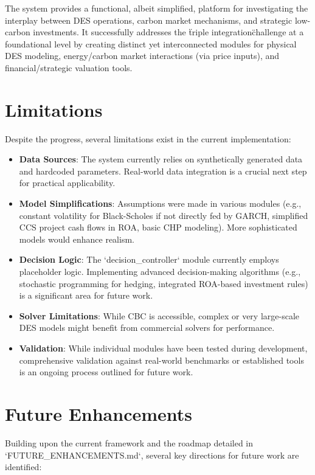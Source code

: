 The system provides a functional, albeit simplified, platform for investigating the interplay between DES operations, carbon market mechanisms, and strategic low-carbon investments. It successfully addresses the \"triple integration\" challenge at a foundational level by creating distinct yet interconnected modules for physical DES modeling, energy/carbon market interactions (via price inputs), and financial/strategic valuation tools.

\section{Limitations}
Despite the progress, several limitations exist in the current implementation:
\begin{itemize}
    \item \textbf{Data Sources}: The system currently relies on synthetically generated data and hardcoded parameters. Real-world data integration is a crucial next step for practical applicability.
    \item \textbf{Model Simplifications}: Assumptions were made in various modules (e.g., constant volatility for Black-Scholes if not directly fed by GARCH, simplified CCS project cash flows in ROA, basic CHP modeling). More sophisticated models would enhance realism.
    \item \textbf{Decision Logic}: The `decision_controller` module currently employs placeholder logic. Implementing advanced decision-making algorithms (e.g., stochastic programming for hedging, integrated ROA-based investment rules) is a significant area for future work.
    \item \textbf{Solver Limitations}: While CBC is accessible, complex or very large-scale DES models might benefit from commercial solvers for performance.
    \item \textbf{Validation}: While individual modules have been tested during development, comprehensive validation against real-world benchmarks or established tools is an ongoing process outlined for future work.
\end{itemize}

\section{Future Enhancements}
Building upon the current framework and the roadmap detailed in `FUTURE_ENHANCEMENTS.md`, several key directions for future work are identified:

